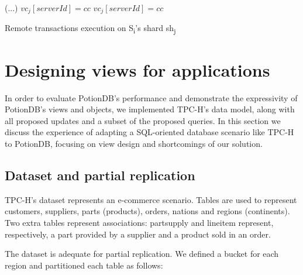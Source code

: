 \documentclass{vldb}
\begin{document}
\begin{algorithm}
	\begin{algorithmic}[1]
			\Statex \hspace*{1.5em} (...)	
			\State $\mathit{vc_j[serverId] = cc}$
		\EndFunction
			\State $\mathit{vc_j[serverId] = cc}$
		\EndFunction
	\end{algorithmic}
	\caption{Remote transactions execution on S\textsubscript{i}'s shard sh\textsubscript{j}}
	\label{alg:replication_mat}
\end{algorithm}

\section{Designing views for applications}
\label{sec:views_for_apps}

In order to evaluate PotionDB's performance and demonstrate the expressivity of PotionDB's views and objects, we implemented TPC-H's data model, along with all proposed updates and a subset of the proposed queries.
In this section we discuss the experience of adapting a SQL-oriented database scenario like TPC-H to PotionDB, focusing on view design and shortcomings of our solution.

\subsection{Dataset and partial replication}
\label{subsec:dataset}

TPC-H's dataset represents an e-commerce scenario. %
Tables are used to represent customers, suppliers, parts (products), orders, nations and regions (continents).
Two extra tables represent associations: partsupply and lineitem represent, respectively, a part provided by a supplier and a product sold in an order. %

The dataset is adequate for partial replication.
We defined a bucket for each region and partitioned each table as follows:
\end{document}
